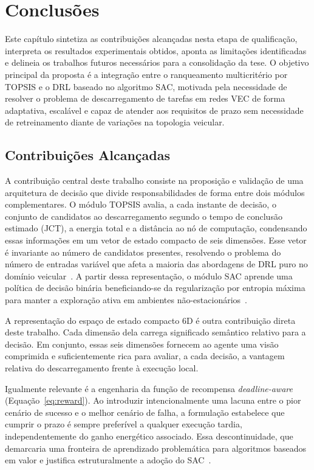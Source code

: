 \chapter{Conclusões}
\label{chap:conclusoes}

Este capítulo sintetiza as contribuições alcançadas nesta etapa de qualificação, interpreta os resultados experimentais obtidos, aponta as limitações identificadas e delineia os trabalhos futuros necessários para a consolidação da tese. O objetivo principal da proposta é a integração entre o ranqueamento multicritério por \gls{TOPSIS} e o \gls{DRL} baseado no algoritmo \gls{SAC}, motivada pela necessidade de resolver o problema de descarregamento de tarefas em redes \gls{VEC} de forma adaptativa, escalável e capaz de atender aos requisitos de prazo sem necessidade de retreinamento diante de variações na topologia veicular.

\section{Contribuições Alcançadas}
\label{sec:contribuicoes-alcancadas}

A contribuição central deste trabalho consiste na proposição e validação de uma arquitetura de decisão que divide responsabilidades de forma entre dois módulos complementares. O módulo \gls{TOPSIS} avalia, a cada instante de decisão, o conjunto de candidatos ao descarregamento segundo o tempo de conclusão estimado (\gls{JCT}), a energia total e a distância ao nó de computação, condensando essas informações em um vetor de estado compacto de seis dimensões. Esse vetor é invariante ao número de candidatos presentes, resolvendo o problema do número de entradas variável que afeta a maioria das abordagens de \gls{DRL} puro no domínio veicular~\cite{uddin2025, tang2024}. A partir dessa representação, o módulo \gls{SAC} aprende uma política de decisão binária beneficiando-se da regularização por entropia máxima para manter a exploração ativa em ambientes não-estacionários~\cite{haarnoja2018sac}.

A representação do espaço de estado compacto 6D é outra contribuição direta deste trabalho. Cada dimensão dela carrega significado semântico relativo para a decisão. Em conjunto, essas seis dimensões fornecem ao agente uma visão comprimida e suficientemente rica para avaliar, a cada decisão, a vantagem relativa do descarregamento frente à execução local.

Igualmente relevante é a engenharia da função de recompensa \textit{deadline-aware} (Equação~\ref{eq:reward}). Ao introduzir intencionalmente uma lacuna entre o pior cenário de sucesso e o melhor cenário de falha, a formulação estabelece que cumprir o prazo é sempre preferível a qualquer execução tardia, independentemente do ganho energético associado. Essa descontinuidade, que demarcaria uma fronteira de aprendizado problemática para algoritmos baseados em valor e justifica estruturalmente a adoção do \gls{SAC}~\cite{ng1999policy, haarnoja2018sac}.

